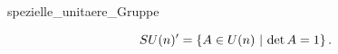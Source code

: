 \documentclass[class=article, crop=false]{standalone}
\begin{document}
\begin{zettel}{spezielle_unitaere_Gruppe}
\begin{flashcard}[]{}
	\[
		SU (n) '= \set{A \in  U (n)}{\det A = 1}
	.\]
\end{flashcard}
\end{zettel}
\end{document}

